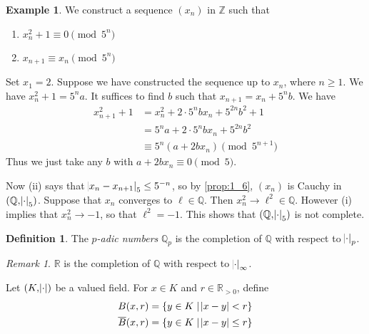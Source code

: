 \documentclass[12pt]{amsart}
\theoremstyle{definition}
\newtheorem{definition}{Definition}[section]
\newtheorem*{example}{Example}
\theoremstyle{plain}
\theoremstyle{remark}
\newtheorem*{remark}{Remark}
\newcommand{\bZ}{\mathbb{Z}}
\newcommand{\bQ}{\mathbb{Q}}
\newcommand{\bR}{\mathbb{R}}
\begin{document}
\begin{example}
    We construct a sequence $(x_n)$ in $\bZ$ such that
    \begin{enumerate}
        \item $x_n^2 + 1 \equiv 0 \pmod{5^n}$
        \item $x_{n + 1} \equiv x_n \pmod{5^n}$
    \end{enumerate}

    Set $x_1 = 2$. Suppose we have constructed the sequence up to $x_n$, where $n \ge 1$. We have $x_n^2 + 1 = 5^n a$. It suffices to find $b$ such that $x_{n+1} = x_n + 5^n b$. We have
    \begin{align*}
        x_{n+1}^2 + 1
        &= x_n^2 + 2 \cdot 5^n b x_n + 5^{2n} b^2 + 1\\
        &= 5^n a + 2 \cdot 5^n b x_n + 5^{2n} b^2\\
        &\equiv 5^n (a + 2 b x_n) \pmod{5^{n+1}}
    \end{align*}
    Thus we just take any $b$ with $a + 2b x_n \equiv 0 \pmod{5}$.

    Now (ii) says that $\abs{x_n - x_{n+1}}_5 \le 5^{-n}$, so by \autoref{prop:1_6}, $(x_n)$ is Cauchy in $(\bQ, \abs{\cdot}_5)$. Suppose that $x_n$ converges to $\ell \in \bQ$. Then $x_n^2 \rightarrow \ell^2 \in \bQ$. However (i) implies that $x_n^2 \rightarrow -1$, so that $\ell^2 = -1$. This shows that $(\bQ, \abs{\cdot}_5)$ is not complete.
\end{example}

\begin{definition}
    The \emph{$p$-adic numbers} $\bQ_p$ is the completion of $\bQ$ with respect to $\abs{\cdot}_p$.
\end{definition}

\begin{remark}
    $\bR$ is the completion of $\bQ$ with respect to $\abs{\cdot}_\infty$.
\end{remark}

\noindent Let $(K, \abs{\cdot})$ be a valued field. For $x \in K$ and $r \in \bR_{> 0}$, define
\begin{align*}
    B(x, r) &= \{y \in K \mid \abs{x - y} < r\}\\
    \overline{B}(x, r) &= \{y \in K \mid \abs{x - y} \le r\}
\end{align*}
\end{document}
